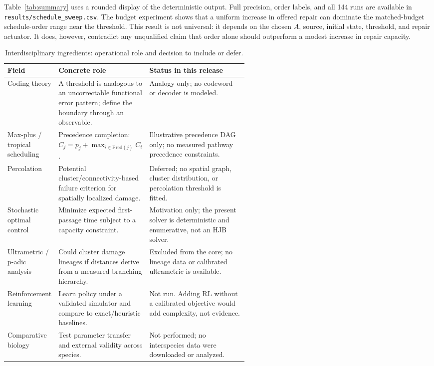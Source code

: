 \documentclass[10pt,letterpaper]{article}
\begin{document}
Table~\ref{tab:summary} uses a rounded display of the deterministic output. Full precision, order labels, and all 144 runs are available in \texttt{results/schedule\_sweep.csv}. The budget experiment shows that a uniform increase in offered repair can dominate the matched-budget schedule-order range near the threshold. This result is not universal: it depends on the chosen $A$, source, initial state, threshold, and repair actuator. It does, however, contradict any unqualified claim that order alone should outperform a modest increase in repair capacity.

\begin{table}[H]
\centering\small
\caption{Interdisciplinary ingredients: operational role and decision to include or defer.}
\label{tab:fields}
\begin{tabularx}{\linewidth}{p{0.21\linewidth}p{0.35\linewidth}X}
\toprule
\textbf{Field} & \textbf{Concrete role} & \textbf{Status in this release}\\
\midrule
Coding theory & A threshold is analogous to an uncorrectable functional error pattern; define the boundary through an observable. & Analogy only; no codeword or decoder is modeled.\\
Max-plus / tropical scheduling & Precedence completion: $C_j=p_j+\max_{i\in\mathrm{Pred}(j)}C_i$. & Illustrative precedence DAG only; no measured pathway precedence constraints.\\
Percolation & Potential cluster/connectivity-based failure criterion for spatially localized damage. & Deferred; no spatial graph, cluster distribution, or percolation threshold is fitted.\\
Stochastic optimal control & Minimize expected first-passage time subject to a capacity constraint. & Motivation only; the present solver is deterministic and enumerative, not an HJB solver.\\
Ultrametric / p-adic analysis & Could cluster damage lineages if distances derive from a measured branching hierarchy. & Excluded from the core; no lineage data or calibrated ultrametric is available.\\
Reinforcement learning & Learn policy under a validated simulator and compare to exact/heuristic baselines. & Not run. Adding RL without a calibrated objective would add complexity, not evidence.\\
Comparative biology & Test parameter transfer and external validity across species. & Not performed; no interspecies data were downloaded or analyzed.\\
\bottomrule
\end{tabularx}
\end{table}
\end{document}

